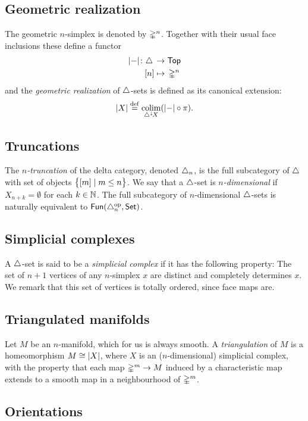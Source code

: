 \subsection{Geometric realization}

The geometric $n$-simplex is denoted by $\gsimplex^n$.
Together with their usual face inclusions these define a functor
\[
\begin{split}
	\bars{-} \colon \simplex \, &\to \Top \\
	[n] &\mapsto \, \gsimplex^n
\end{split}
\]
and the \textit{geometric realization} of $\simplex$-sets is defined as its canonical extension:
\[
\bars{X} \defeq \colim_{\deltaover{X}}(\bars{-} \circ \pi).
\]

\subsection{Truncations}

The \textit{$n$-truncation} of the delta category, denoted $\simplex_n$, is the full subcategory of $\simplex$ with set of objects $\set[\big]{[m] \mid m \leq n}$.
We say that a $\simplex$-set is \textit{$n$-dimensional} if $X_{n+k} = \emptyset$ for each $k \in \N$.
The full subcategory of $n$-dimensional $\simplex$-sets is naturally equivalent to $\Fun(\simplex^\op_n, \Set)$.

\subsection{Simplicial complexes}

A $\simplex$-set is said to be a \textit{simplicial complex} if it has the following property: The set of $n+1$ vertices of any $n$-simplex $x$ are distinct and completely determines $x$.
We remark that this set of vertices is totally ordered, since face maps are.

\subsection{Triangulated manifolds}

Let $M$ be an $n$-manifold, which for us is always smooth.
A \textit{triangulation} of $M$ is a homeomorphism $M \cong \bars{X}$, where $X$ is an ($n$-dimensional) simplicial complex, with the property that each map $\gsimplex^m \to M$ induced by a characteristic map extends to a smooth map in a neighbourhood of $\gsimplex^m$.

\subsection{Orientations}

